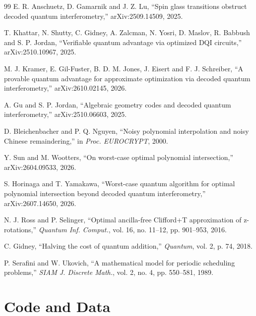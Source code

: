 \documentclass[journal]{IEEEtran}
\begin{document}
\begin{thebibliography}{99}
E. R. Anschuetz, D. Gamarnik and J. Z. Lu, ``Spin glass transitions obstruct decoded quantum interferometry,'' arXiv:2509.14509, 2025.

T. Khattar, N. Shutty, C. Gidney, A. Zalcman, N. Yosri, D. Maslov, R. Babbush and S. P. Jordan, ``Verifiable quantum advantage via optimized DQI circuits,'' arXiv:2510.10967, 2025.

M. J. Kramer, E. Gil-Fuster, B. D. M. Jones, J. Eisert and F. J. Schreiber, ``A provable quantum advantage for approximate optimization via decoded quantum interferometry,'' arXiv:2610.02145, 2026.

A. Gu and S. P. Jordan, ``Algebraic geometry codes and decoded quantum interferometry,'' arXiv:2510.06603, 2025.

D. Bleichenbacher and P. Q. Nguyen, ``Noisy polynomial interpolation and noisy Chinese remaindering,'' in \emph{Proc. EUROCRYPT}, 2000.

Y. Sun and M. Wootters, ``On worst-case optimal polynomial intersection,'' arXiv:2604.09533, 2026.

S. Horinaga and T. Yamakawa, ``Worst-case quantum algorithm for optimal polynomial intersection beyond decoded quantum interferometry,'' arXiv:2607.14650, 2026.

N. J. Ross and P. Selinger, ``Optimal ancilla-free Clifford+T approximation of z-rotations,'' \emph{Quantum Inf. Comput.}, vol. 16, no. 11--12, pp. 901--953, 2016.

C. Gidney, ``Halving the cost of quantum addition,'' \emph{Quantum}, vol. 2, p. 74, 2018.

P. Serafini and W. Ukovich, ``A mathematical model for periodic scheduling problems,'' \emph{SIAM J. Discrete Math.}, vol. 2, no. 4, pp. 550--581, 1989.

\end{thebibliography}

\appendices

\section{Code and Data}
\label{app:code}
\end{document}
